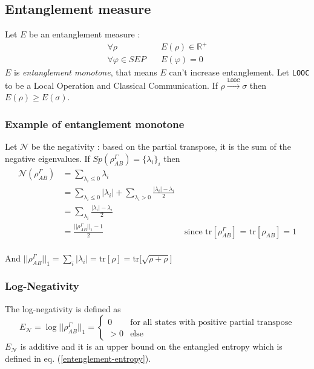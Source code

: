 \documentclass{article}
\begin{document}
\subsection{Entanglement measure}
Let $E$ be an entanglement measure :
\begin{equation}
    \begin{aligned}
        \forall \rho \quad
            & E(\rho) \in \mathbb{R}^+\\
        \forall \varphi \in SEP \quad
            & E(\varphi) = 0
    \end{aligned}
\end{equation}
$E$ is \textit{entanglement monotone}, that means $E$ can't increase
entanglement. Let \texttt{LOOC} to be a Local Operation and Classical
Communication. If $\rho \xrightarrow{\texttt{LOOC}} \sigma $ then $E(\rho) \geq
E(\sigma)$.

\subsubsection*{Example of entanglement monotone}
Let $\mathscr{N}$ be the negativity : based on the partial transpose, it is the
sum of the negative eigenvalues. If $Sp(\rho_{AB}^\Gamma) = \{\lambda_i\}_i$ then
\begin{equation}
    \begin{aligned}
        \mathscr{N}(\rho_{AB}^\Gamma)
            & = \sum_{\lambda_i \leq 0}\lambda_i \\
            & = \sum_{\lambda_i \leq 0} |\lambda_i| +
                \sum_{\lambda_i > 0} \frac{ |\lambda_i| - \lambda_i}{2} \\
            & = \sum_{\lambda_i} \frac{ |\lambda_i| - \lambda_i}{2} \\
            & = \frac{||\rho_{AB}^\Gamma||_1 - 1 }{2} & \text{ since tr$[\rho_{AB}^\Gamma]$ = tr$[\rho_{AB}] = 1$} \\
    \end{aligned}
\end{equation}

And $||\rho_{AB}^\Gamma||_1 = \sum_i |\lambda_i| = \text{tr}[\rho] =\text{tr}\big[\sqrt{\rho + \rho}\big]$

\subsubsection{Log-Negativity}
The log-negativity is defined as
\begin{equation}
    E_{\mathscr{N}} = \log ||\rho_{AB}^\Gamma||_1 =
    \begin{cases}
        0 & \text{for all states with positive partial transpose}\\
        > 0 & \text{else}
    \end{cases}
\end{equation}
$E_{\mathscr{N}}$ is additive and it is an upper bound on the
entangled entropy which is defined in eq. (\ref{entenglement-entropy}).
\newpage
\end{document}
